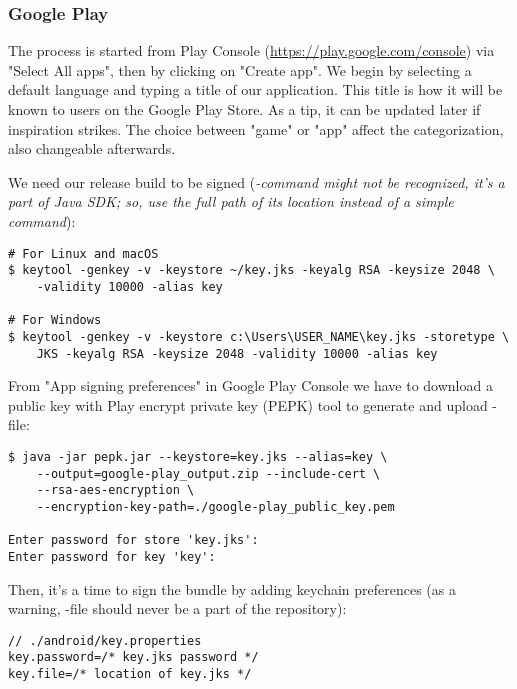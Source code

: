 
\subsubsection{Google Play}

The process is started from Play Console (\href{https://play.google.com/console}{https://play.google.com/console}) 
via "Select All apps", then by clicking on "Create app". We begin by selecting a default language and typing a 
title of our application. This title is how it will be known to users on the Google Play Store. As a tip, it can be 
updated later if inspiration strikes. The choice between "game" or "app" affect the categorization, also changeable 
afterwards.

We need our release build to be signed (\emph{-command might not be recognized, it's a part of Java SDK; so,
use the full path of its location instead of a simple command}):

\begin{lstlisting}[language=terminal]
# For Linux and macOS
$ keytool -genkey -v -keystore ~/key.jks -keyalg RSA -keysize 2048 \
    -validity 10000 -alias key

# For Windows
$ keytool -genkey -v -keystore c:\Users\USER_NAME\key.jks -storetype \
    JKS -keyalg RSA -keysize 2048 -validity 10000 -alias key
\end{lstlisting}

\noindent From "App signing preferences" in Google Play Console we have to download a public key with Play encrypt 
private key (PEPK) tool to generate and upload -file:

\begin{lstlisting}[language=terminal]
$ java -jar pepk.jar --keystore=key.jks --alias=key \
    --output=google-play_output.zip --include-cert \
    --rsa-aes-encryption \
    --encryption-key-path=./google-play_public_key.pem 

Enter password for store 'key.jks':
Enter password for key 'key':
\end{lstlisting}

\noindent Then, it's a time to sign the bundle by adding keychain preferences (as a warning, -file 
should never be a part of the repository):

\begin{lstlisting}
// ./android/key.properties
key.password=/* key.jks password */
key.file=/* location of key.jks */
\end{lstlisting}

